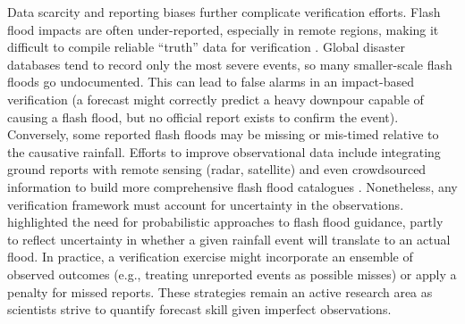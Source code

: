 Data scarcity and reporting biases further complicate verification efforts. Flash flood impacts are often under-reported, especially in remote regions, making it difficult to compile reliable “truth” data for verification \citep{Hapuarachchi2011}. Global disaster databases tend to record only the most severe events, so many smaller-scale flash floods go undocumented. This can lead to false alarms in an impact-based verification (a forecast might correctly predict a heavy downpour capable of causing a flash flood, but no official report exists to confirm the event). Conversely, some reported flash floods may be missing or mis-timed relative to the causative rainfall. Efforts to improve observational data include integrating ground reports with remote sensing (radar, satellite) and even crowdsourced information to build more comprehensive flash flood catalogues \citep{Pham2020}. Nonetheless, any verification framework must account for uncertainty in the observations. \citet{Ntelekos2006} highlighted the need for probabilistic approaches to flash flood guidance, partly to reflect uncertainty in whether a given rainfall event will translate to an actual flood. In practice, a verification exercise might incorporate an ensemble of observed outcomes (e.g., treating unreported events as possible misses) or apply a penalty for missed reports. These strategies remain an active research area as scientists strive to quantify forecast skill given imperfect observations.

